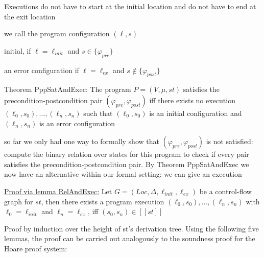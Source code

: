 \documentclass[landscape, a4paper]{article}
\begin{document}
\begin{minipage}[t]{0.2\linewidth}
\begin{betterlist}
		\begin{betterlist}
			\item Executions do not have to start at the initial location and do not have to end at the exit location
		\end{betterlist}
		\item we call the program configuration $(\ell, s)$
		\begin{betterlist}
			\item \alert{initial}, if $\ell= \ell_{init}$ and $s \in\{\varphi_{pre}\}$
			\item an \alert{error configuration} if $\ell= \ell_{ex}$ and $s \not\in \{\varphi_{post}\}$
		\end{betterlist}
		\item \alert{Theorem PppSatAndExec:} The program $P = (V, \mu, st)$ satisfies the precondition-postcondition pair $(\varphi_{pre}, \varphi_{post})$ iff there exists no execution $(\ell_0, s_0), \ldots, (\ell_n, s_n)$ such that $(\ell_0, s_0)$ is an initial configuration and $(\ell_n, s_n)$ is an error configuration
		\begin{betterlist}
			\item so far we only had one way to formally show that $(\varphi_{pre}, \varphi_{post})$ is not satisfied: compute the binary relation over states for this program to check if every pair satisfies the precondition-postcondition pair. By Theorem PppSatAndExec we now have an alternative within our formal setting: we can give an execution
			\item {}
			\item \underline{Proof via lemma \alert{RelAndExec}:} Let $G = (Loc, \Delta, \ell_{init}, \ell_{ex})$ be a control-flow graph for $st$, then there exists a program execution $(\ell_0, s_0), . . . , (\ell_n, s_n)$ with $\ell_0 = \ell_{init}$ and $\ell_n = \ell_{ex}$, iff $(s_0, s_n) \in [[st]]$
			\begin{betterlist}
				\item Proof by induction over the height of st’s derivation tree. Using the following five lemmas, the proof can be carried out analogously to the soundness proof for the Hoare proof system:
				\begin{betterlist}
					\item {}
					\item {}
					\item {}

\end{betterlist}
\end{betterlist}
\end{betterlist}
\end{betterlist}
\end{minipage}
\end{document}
